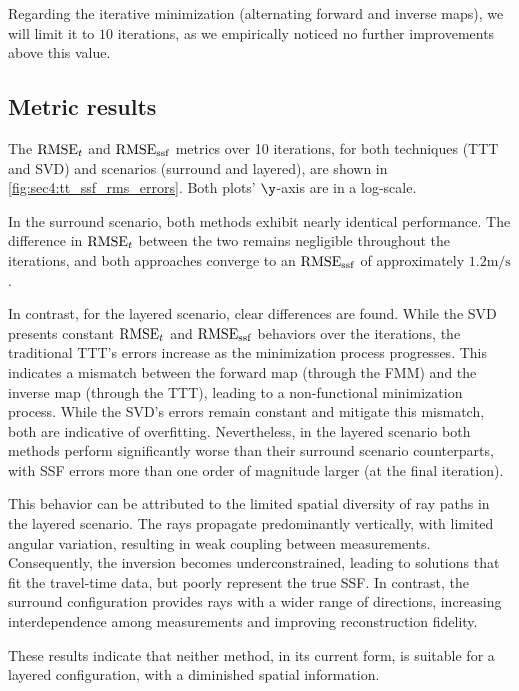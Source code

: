 Regarding the iterative minimization (alternating forward and inverse maps), we will limit it to $10$ iterations, as we empirically noticed no further improvements above this value.

\subsection{Metric results}

The $\operatorname{RMSE}_{t}$ and $\operatorname{RMSE}_{\operatorname{ssf}}$ metrics over 10 iterations, for both techniques (TTT and SVD) and scenarios (surround and layered), are shown in \cref{fig:sec4:tt_ssf_rms_errors}. Both plots' $\y$-axis are in a log-scale.

In the surround scenario, both methods exhibit nearly identical performance. The difference in $\operatorname{RMSE}_{t}$ between the two remains negligible throughout the iterations, and both approaches converge to an $\operatorname{RMSE}_{\operatorname{ssf}}$ of approximately $1.2\si{\meter/\second}$.

In contrast, for the layered scenario, clear differences are found. While the SVD presents constant $\operatorname{RMSE}_{t}$ and $\operatorname{RMSE}_{\operatorname{ssf}}$ behaviors over the iterations, the traditional TTT's errors increase as the minimization process progresses. This indicates a mismatch between the forward map (through the FMM) and the inverse map (through the TTT), leading to a non-functional minimization process. While the SVD's errors remain constant and mitigate this mismatch, both are indicative of overfitting. Nevertheless, in the layered scenario both methods perform significantly worse than their surround scenario counterparts, with SSF errors more than one order of magnitude larger (at the final iteration).

This behavior can be attributed to the limited spatial diversity of ray paths in the layered scenario. The rays propagate predominantly vertically, with limited angular variation, resulting in weak coupling between measurements. Consequently, the inversion becomes underconstrained, leading to solutions that fit the travel-time data, but poorly represent the true SSF. In contrast, the surround configuration provides rays with a wider range of directions, increasing interdependence among measurements and improving reconstruction fidelity.

These results indicate that neither method, in its current form, is suitable for a layered configuration, with a diminished spatial information.

